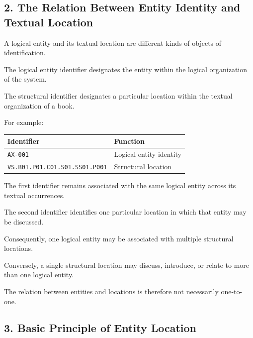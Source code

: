 
\subsection*{2. The Relation Between Entity Identity
and Textual Location}

A logical entity and its textual location
are different kinds of objects of identification.

The logical entity identifier designates
the entity within the logical organization
of the system.

The structural identifier designates
a particular location within the textual
organization of a book.

For example:

\begin{center}
\begin{tabular}{ll}
    \toprule
    \textbf{Identifier} & \textbf{Function} \\
    \midrule
    \texttt{AX-001}
        & Logical entity identity \\
    \texttt{VS.B01.P01.C01.S01.SS01.P001}
        & Structural location \\
    \bottomrule
\end{tabular}
\end{center}

The first identifier remains associated
with the same logical entity across
its textual occurrences.

The second identifier identifies
one particular location in which
that entity may be discussed.

Consequently, one logical entity may
be associated with multiple structural
locations.

Conversely, a single structural location
may discuss, introduce, or relate
to more than one logical entity.

The relation between entities and
locations is therefore not necessarily
one-to-one.


\subsection*{3. Basic Principle of Entity Location}

